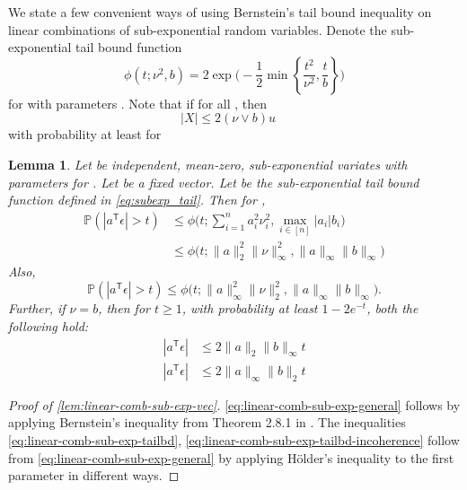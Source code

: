 \documentclass[ejs,noshowframe]{imsart}
\theoremstyle{plain}
\newtheorem{lemma}[theorem]{Lemma}
\theoremstyle{definition}
\renewcommand{\P}{\mathbb{P}}
\newcommand{\R}{\mathbb{R}}
\renewcommand{\top}{\mathsf{T}}
\begin{document}
\begin{appendix}
We state a few convenient ways of using Bernstein's tail bound inequality on 
linear combinations of sub-exponential random variables. 
Denote the sub-exponential tail bound function
\begin{equation}
\label{eq:subexp_tail}
\phi(t;\nu^2, b) = 2 \exp\bigg( -\frac{1}{2} \min\left\{ \frac{t^2}{\nu^2}, 
\frac{t}{b} \right\} \bigg)
\end{equation}
for  with parameters .
Note that
if \smash{$\P(|X|>t) \leq \phi(t;\nu^2, b)$} for all , then  
\begin{equation}
\label{eq:subexp_tail_highprob_bd}
|X| \leq 2(\nu \vee b) u \quad 
\end{equation}
with probability at least  for  
\begin{lemma}
\label{lem:linear-comb-sub-exp-vec}
Let  be independent, mean-zero, sub-exponential variates 
with 
parameters  for . Let 
\smash{$a\in\R^n$} be a 
fixed vector.
Let \smash{$\phi$} be the sub-exponential tail bound function defined in 
\eqref{eq:subexp_tail}.
 Then for ,
\begin{align}
\label{eq:linear-comb-sub-exp-general}
\P ( |a^\top\epsilon| > t) 
&\leq \phi \big(t; \sum_{i=1}^n a_i^2 \nu_i^2, \max_{i\in[n]} |a_i| b_i \big)\\
\label{eq:linear-comb-sub-exp-tailbd}
&\leq \phi \big(t; \|a\|_2^2 \|\nu\|_\infty^2, \|a\|_\infty \|b\|_\infty \big)
\end{align}
Also, 
\begin{equation}
\label{eq:linear-comb-sub-exp-tailbd-incoherence}
\P ( |a^\top\epsilon| > t) 
\leq \phi \big(t; \|a\|_\infty^2 \|\nu\|_2^2, \|a\|_\infty \|b\|_\infty \big).
\end{equation}
Further, if $\nu=b$, then for $t\geq 1$, with probability at least $1-2e^{-t}$, 
both the following hold:
\begin{align}
\label{eq:linear-comb-sub-exp-highprob}
|a^\top\epsilon| &\leq 2 \|a\|_2 \|b\|_\infty t \\
\label{eq:linear-comb-sub-exp-highprob-incoherence}
|a^\top\epsilon| &\leq 2 \|a\|_\infty \|b\|_2 t
\end{align}
\end{lemma}
\begin{proof}[Proof of \autoref{lem:linear-comb-sub-exp-vec}]
\eqref{eq:linear-comb-sub-exp-general} follows by applying Bernstein's 
inequality 
from Theorem 2.8.1 in \citep{Vershynin2018}. 
The  inequalities \eqref{eq:linear-comb-sub-exp-tailbd}, 
\eqref{eq:linear-comb-sub-exp-tailbd-incoherence} follow from 
\eqref{eq:linear-comb-sub-exp-general} by applying H\"older's inequality to the 
first parameter in different ways.


\end{proof}
\end{appendix}
\end{document}
